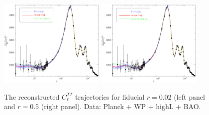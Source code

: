 \documentclass[11pt]{article}
\def \halffigwidth{0.45\textwidth}
\begin{document}
\begin{figure}
\includegraphics[width = \halffigwidth]{nobicep_spline0_p11_r0d5_clTT_trajs.pdf}%
\includegraphics[width = \halffigwidth]{spline0_p11_clTT_trajs.pdf}
\caption{The reconstructed $C_\ell^{TT}$ trajectories for fiducial $r=0.02$ (left panel and $r=0.5$ (right panel). Data: Planck + WP + highL + BAO.\label{fig:traj_cltt}}
\end{figure}
\end{document}
